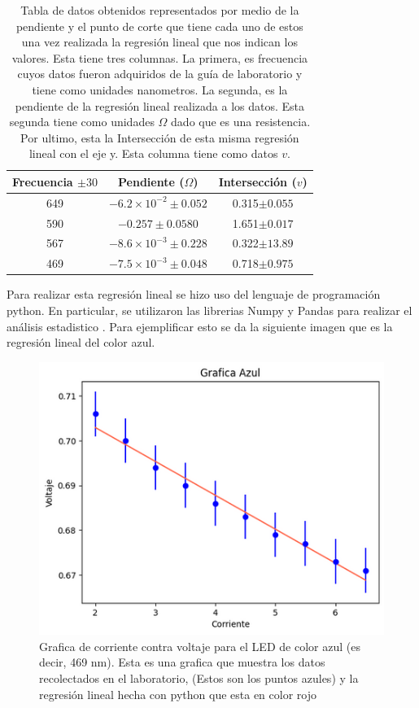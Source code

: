 \documentclass[a4paper, amsfonts, amssymb, amsmath, reprint, showkeys, nofootinbib, twoside]{revtex4-1}
\begin{document}
\begin{table}
   \centering
   \caption{Tabla de datos obtenidos representados por medio de la pendiente y el punto de corte que tiene cada uno de estos una vez realizada la regresión lineal que nos indican los valores. Esta tiene tres columnas. La primera, es frecuencia cuyos datos fueron adquiridos de la guía de laboratorio \cite{Guia} y tiene como unidades nanometros. La segunda, es la pendiente de la regresión lineal realizada a los datos. Esta segunda tiene como unidades $\Omega$ dado que es una resistencia. Por ultimo, esta la Intersección de esta misma regresión lineal con el eje y. Esta columna tiene como datos $v$.}
\begin{tabular}{|c|c|c|}
   \hline
   \hline
   Frecuencia $\pm 30$& Pendiente ($\Omega$) & Intersección ($v$)\\
   \hline
   649 & $-6.2\times10^{-2} \pm 0.052$  & 0.315$\pm 0.055$\\
   590 & $-0.257\pm 0.0580 $         & 1.651$\pm 0.017$\\
   567 & $-8.6\times10^{-3} \pm 0.228 $ & 0.322$\pm 13.89$\\ 
   469 & $-7.5\times10^{-3} \pm 0.048$  & 0.718$\pm 0.975$\\
   \hline
   \hline
\end{tabular}
   \label{table:Datos}
\end{table}
Para realizar esta regresión lineal se hizo uso del lenguaje de programación python. En particular, se utilizaron las librerias Numpy y Pandas para realizar el análisis estadistico \cite{numpy.polyfit}. Para ejemplificar esto se da la siguiente imagen que es la regresión lineal del color azul.
\begin{figure}[H]
   \centering
   \includegraphics[scale=0.3]{Grafica_Azul.png}
   \caption{Grafica de corriente contra voltaje para el LED de color azul (es decir, 469 nm). Esta es una grafica que muestra los datos recolectados en el laboratorio, (Estos son los puntos azules) y la regresión lineal hecha con python que esta en color rojo}
   \label{fig:Azul}
\end{figure}
\end{document}
